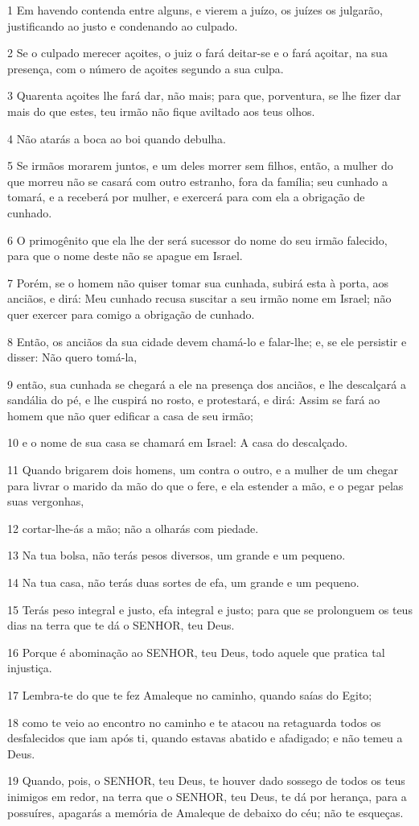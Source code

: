 \par 1 Em havendo contenda entre alguns, e vierem a juízo, os juízes os julgarão, justificando ao justo e condenando ao culpado.
\par 2 Se o culpado merecer açoites, o juiz o fará deitar-se e o fará açoitar, na sua presença, com o número de açoites segundo a sua culpa.
\par 3 Quarenta açoites lhe fará dar, não mais; para que, porventura, se lhe fizer dar mais do que estes, teu irmão não fique aviltado aos teus olhos.
\par 4 Não atarás a boca ao boi quando debulha.
\par 5 Se irmãos morarem juntos, e um deles morrer sem filhos, então, a mulher do que morreu não se casará com outro estranho, fora da família; seu cunhado a tomará, e a receberá por mulher, e exercerá para com ela a obrigação de cunhado.
\par 6 O primogênito que ela lhe der será sucessor do nome do seu irmão falecido, para que o nome deste não se apague em Israel.
\par 7 Porém, se o homem não quiser tomar sua cunhada, subirá esta à porta, aos anciãos, e dirá: Meu cunhado recusa suscitar a seu irmão nome em Israel; não quer exercer para comigo a obrigação de cunhado.
\par 8 Então, os anciãos da sua cidade devem chamá-lo e falar-lhe; e, se ele persistir e disser: Não quero tomá-la,
\par 9 então, sua cunhada se chegará a ele na presença dos anciãos, e lhe descalçará a sandália do pé, e lhe cuspirá no rosto, e protestará, e dirá: Assim se fará ao homem que não quer edificar a casa de seu irmão;
\par 10 e o nome de sua casa se chamará em Israel: A casa do descalçado.
\par 11 Quando brigarem dois homens, um contra o outro, e a mulher de um chegar para livrar o marido da mão do que o fere, e ela estender a mão, e o pegar pelas suas vergonhas,
\par 12 cortar-lhe-ás a mão; não a olharás com piedade.
\par 13 Na tua bolsa, não terás pesos diversos, um grande e um pequeno.
\par 14 Na tua casa, não terás duas sortes de efa, um grande e um pequeno.
\par 15 Terás peso integral e justo, efa integral e justo; para que se prolonguem os teus dias na terra que te dá o SENHOR, teu Deus.
\par 16 Porque é abominação ao SENHOR, teu Deus, todo aquele que pratica tal injustiça.
\par 17 Lembra-te do que te fez Amaleque no caminho, quando saías do Egito;
\par 18 como te veio ao encontro no caminho e te atacou na retaguarda todos os desfalecidos que iam após ti, quando estavas abatido e afadigado; e não temeu a Deus.
\par 19 Quando, pois, o SENHOR, teu Deus, te houver dado sossego de todos os teus inimigos em redor, na terra que o SENHOR, teu Deus, te dá por herança, para a possuíres, apagarás a memória de Amaleque de debaixo do céu; não te esqueças.

